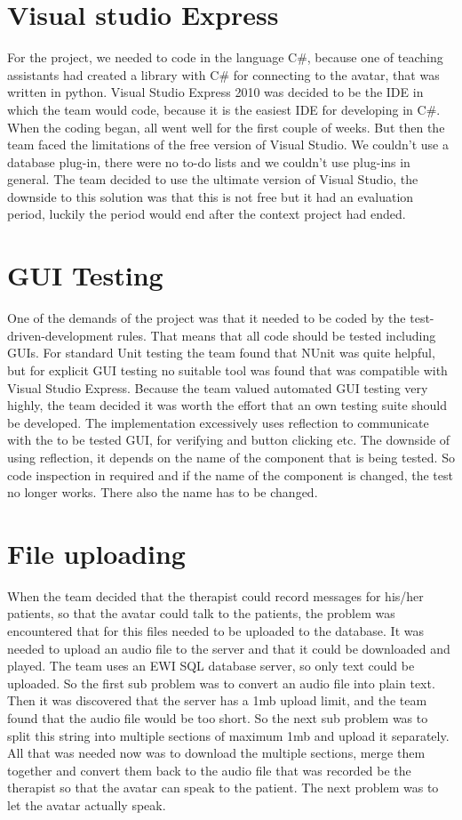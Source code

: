\section{Visual studio Express}
For the project, we needed to code in the language C\#, because one of teaching assistants had created a library with C\# for connecting to the avatar, that was written in python. Visual Studio Express 2010 was decided to be the IDE in which the team would code, because it is the easiest IDE for developing in C\#. When the coding began, all went well for the first couple of weeks. But then the team faced the limitations of the free version of Visual Studio. We couldn't use a database plug-in, there were no to-do lists and we couldn't use plug-ins in general. The team decided to use the ultimate version of Visual Studio, the downside to this solution was that this is not free but it had an evaluation period, luckily the period would end after the context project had ended.
\section{GUI Testing}
One of the demands of the project was that it needed to be coded by the test-driven-development rules. That means that all code should be tested including GUIs. For standard Unit testing the team found that NUnit was quite helpful, but for explicit GUI testing no suitable tool was found that was compatible with Visual Studio Express. Because the team valued automated GUI testing very highly, the team decided it was worth the effort that an own testing suite should be developed. The implementation excessively uses reflection to communicate with the to be tested GUI, for verifying and button clicking etc. The downside of using reflection, it depends on the name of the component that is being tested. So code inspection in required and if the name of the component is changed, the test no longer works. There also the name has to be changed.
\section{File uploading}
When the team decided that the therapist could record messages for his/her patients, so that the avatar could talk to the patients, the problem was encountered that for this files needed to be uploaded to the database. It was needed to upload an audio file to the server and that it could be downloaded and played. The team uses an EWI SQL database server, so only text could be uploaded. So the first sub problem was to convert an audio file into plain text. Then it was discovered that the server has a 1mb upload limit, and the team found that the audio file would be too short. So the next sub problem was to split this string into multiple sections of maximum 1mb and upload it separately. All that was needed now was to download the multiple sections, merge them together and convert them back to the audio file that was recorded be the therapist so that the avatar can speak to the patient. The next problem was to let the avatar actually speak.
